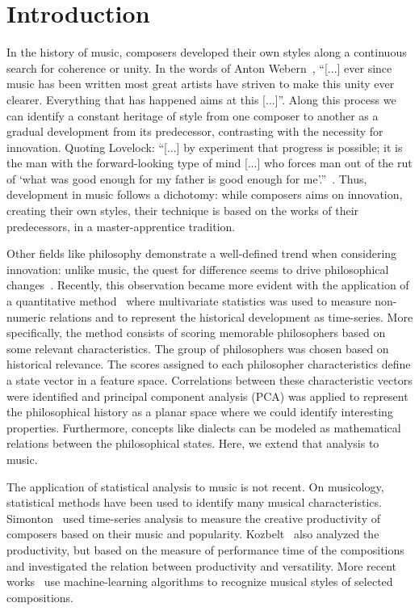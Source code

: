 \documentclass[
 aip,
 jmp,
 amsmath,amssymb,
 reprint,
]{revtex4-1}
\begin{document}
\section{\label{sec:level1}Introduction}

In the history of music, composers developed their own styles along a
continuous search for coherence or unity. In the words of Anton
Webern~\cite{Webern}, ``[...] ever since music has been written most great artists
have striven to make this unity ever clearer. Everything that has
happened aims at this [...]''. Along this process we can identify
a constant heritage of style from one composer to another as
a gradual development from its
predecessor, contrasting with the necessity for innovation. Quoting
Lovelock: 
``[...] by experiment that progress is possible; it is the man
with the forward-looking type of mind [...] who forces man out of the
rut of `what was good enough for my father is good enough for me'.''~\cite{Lovelock}.
Thus, development in music follows a dichotomy: while composers aims on
innovation, creating their own styles, their technique is based on the
works of their predecessors, in a master-apprentice tradition.

Other fields like philosophy demonstrate
a well-defined trend when considering innovation: unlike music, the
quest for difference seems to drive philosophical
changes~\cite{Deleuze}. Recently, this observation became more evident with
the application of a quantitative method~\cite{Fabbri} where
multivariate statistics was used to measure non-numeric relations and
to represent the historical development as time-series. More specifically, the method consists of
scoring memorable philosophers based on some relevant
characteristics. The group of philosophers was chosen
based on historical relevance. The
scores assigned to each philosopher characteristics define a state
vector in a feature space. Correlations between these
characteristic vectors were identified and principal component
analysis (PCA) was applied to
represent the philosophical history as a planar space where we could
identify interesting properties. Furthermore, concepts
like dialects can be modeled as mathematical relations between the
philosophical states. Here, we extend that analysis to music.

The application of statistical analysis to
music is not recent. On musicology, statistical methods have been used
to identify many musical characteristics.
Simonton~\cite{Simonton1991829, Simonton1977791} used time-series analysis to measure the creative productivity
of composers based on their music and popularity. Kozbelt~\cite{Kozbelt01012009, Kozbelt01012007} also
analyzed the productivity, but based on the measure of performance
time of the compositions and investigated the relation between
productivity and versatility. More recent works~\cite{Kranenburg2004, Kranenburg2007} use machine-learning
algorithms to recognize musical styles of selected compositions.
\end{document}
